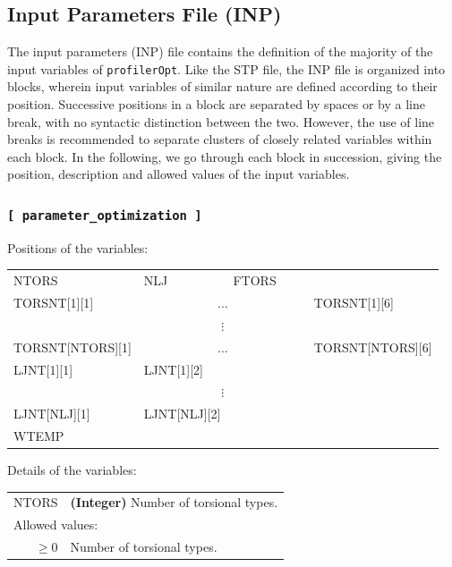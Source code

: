 \documentclass[10pt,a4paper,openany]{memoir}
\numberwithin{equation}{section}
\newcommand{\profileropt}[0]{\texttt{profilerOpt}}
\begin{document}
\subsection{Input Parameters File (INP)}
\label{sec:file-formats-INP}

The input parameters (INP) file contains the definition of the
majority of the input variables of \profileropt{}.  Like the STP file,
the INP file is organized into blocks, wherein input variables of
similar nature are defined according to their position.  Successive
positions in a block are separated by spaces or by a line break, with
no syntactic distinction between the two.  However, the use of line
breaks is recommended to separate clusters of closely related
variables within each block.  In the following, we go through each
block in succession, giving the position, description and allowed
values of the input variables.

\subsubsection{\texttt{[~parameter\_optimization~]}}
\label{sec:inp-parameter_optimization}

Positions of the variables:
\begin{center}
    \begin{tabular}{llllll}
    NTORS & NLJ & FTORS & & & \\
    TORSNT[1][1] & \multicolumn{4}{c}{$\ldots$} & TORSNT[1][6] \\
    \multicolumn{6}{c}{$\vdots$} \\
    TORSNT[NTORS][1] & \multicolumn{4}{c}{$\ldots$} & TORSNT[NTORS][6] \\
    LJNT[1][1] & LJNT[1][2] &  & & & \\
    \multicolumn{6}{c}{$\vdots$} \\
    LJNT[NLJ][1] & LJNT[NLJ][2] &  & & & \\
    WTEMP
  \end{tabular}
\end{center}

\noindent Details of the variables:
\vspace{2ex}

{
\begin{tabular}{r@{ : }l}
\label{descr:ntors}
     NTORS&\textbf{(Integer)} Number of torsional types.                                                       \\ 
\multicolumn{2}{l}{Allowed values:} \\ 
     \( \geq 0\)& Number of torsional types.                                                          \\ 
\end{tabular}
\vspace{1ex}
}
\end{document}
